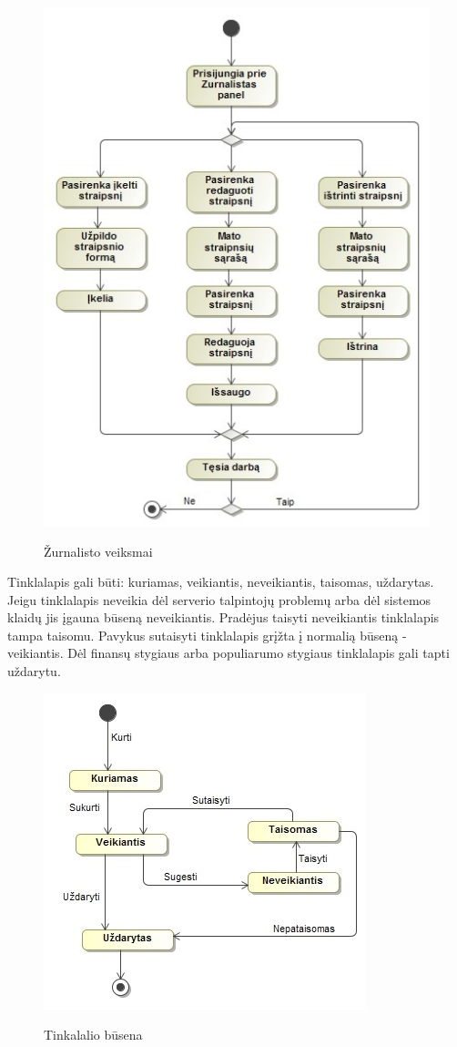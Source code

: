 ﻿\documentclass{VUMIFPSkursinis}
\begin{document}
\begin{figure}[H]
	\centering
    \includegraphics[scale=0.5]{img/Pav/ZurnalistasStraipsniai}
	\label{uml:28}
	\caption{Žurnalisto veiksmai}
\end{figure}

Tinklalapis gali būti: kuriamas, veikiantis, neveikiantis, taisomas, uždarytas. Jeigu tinklalapis neveikia dėl serverio talpintojų problemų arba dėl sistemos klaidų jis įgauna būseną neveikiantis. Pradėjus taisyti neveikiantis tinklalapis tampa taisomu. Pavykus sutaisyti tinklalapis grįžta į normalią būseną - veikiantis. Dėl finansų stygiaus arba populiarumo stygiaus tinklalapis gali tapti uždarytu.

\begin{figure}[H]
	\centering
    \includegraphics[scale=0.5]{img/Pav/TinklalapioBusena}
	\label{uml:29}
	\caption{Tinkalalio būsena}
\end{figure}
\end{document}

